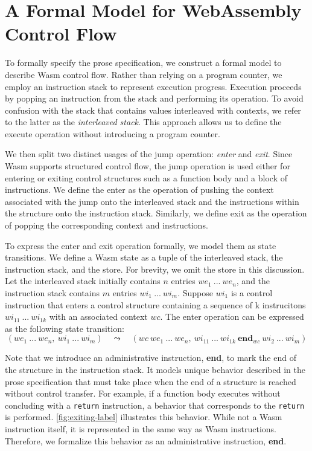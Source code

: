 \section{A Formal Model for WebAssembly Control Flow}
\label{sec:model}


To formally specify the prose specification, we construct a formal model to
describe Wasm control flow.
Rather than relying on a program counter, we employ an instruction stack to
represent execution progress.
Execution proceeds by popping an instruction from the stack and performing its
operation.
To avoid confusion with the stack that contains values interleaved with
contexts, we refer to the latter as the \textit{interleaved stack}.
This approach allows us to define the execute operation without introducing a
program counter.


We then split two distinct usages of the jump operation: \textit{enter} and
\textit{exit}.
Since Wasm supports structured control flow, the jump operation is used either
for entering or exiting control structures such as a function body and a block
of instructions.
We define the enter as the operation of pushing the context associated with the
jump onto the interleaved stack and the instructions within the structure onto
the instruction stack.
Similarly, we define exit as the operation of popping the corresponding context
and instructions.


To express the enter and exit operation formally, we model them as state
transitions.
We define a Wasm state as a tuple of the interleaved stack, the instruction
stack, and the store.
For brevity, we omit the store in this discussion.
Let the interleaved stack initially contains $n$ entries $we_1 ~ ... ~ we_n$,
and the instruction stack contains $m$ entries $wi_1 ~ ... ~ wi_m$.
Suppose $wi_1$ is a control instruction that enters a control structure
containing a sequence of k instrucitons $wi_{11} ~ ... ~ wi_{1k}$ with an
associated context $wc$.
The enter operation can be expressed as the following state transition:
\[
(we_1 ~ ... ~ we_n, ~ wi_1 ~ ... ~ wi_m) \quad\leadsto\quad
  (
    wc ~ we_1 ~ ...  ~ we_n, ~
    wi_{11} ~ ... ~ wi_{1k} ~ \textbf{end}_{wc} ~ wi_2 ~ ... ~ wi_m
  )
\]


Note that we introduce an administrative instruction, \textbf{end}, to mark the
end of the structure in the instruction stack.
It models unique behavior described in the prose specification that must take
place when the end of a structure is reached without control transfer.
For example, if a function body executes without concluding with a
\texttt{return} instruction, a behavior that corresponds to the \texttt{return}
is performed.
\cref{fig:exiting-label} illustrates this behavior.
While not a Wasm instruction itself, it is represented in the same way as Wasm
instructions.
Therefore, we formalize this behavior as an administrative instruction,
\textbf{end}.


